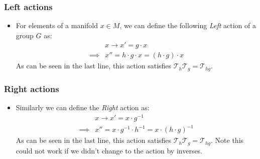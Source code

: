 \documentclass[11pt]{article}
\numberwithin{equation}{section}
\begin{document}
     \subsubsection{Left actions}
     \begin{itemize}
       \item For elements of a manifold $x \in M$, we can define the following \emph{Left} action of a group $G$ as: 
       \begin{align*}
       & x \rightarrow x' = g \cdot x \\ 
        \implies & x'' = h\cdot g \cdot x = (h \cdot g) \cdot x
       \end{align*}
       As can be seen in the last line, this action satisfies $\mathcal{T}_{h}\mathcal{T}_{g}=\mathcal{T}_{hg}$. 
     \end{itemize}
          \subsubsection{Right actions}
     \begin{itemize}
       \item Similarly we can define the  \emph{Right} action as: 
       \begin{align*}
       & x \rightarrow x' =  x \cdot g^{-1}\\ 
        \implies & x'' = x \cdot g^{-1} \cdot h^{-1} = x \cdot (h \cdot g)^{-1}
       \end{align*}
       As can be seen in the last line, this action satisfies $\mathcal{T}_{h}\mathcal{T}_{g}=\mathcal{T}_{hg}$. Note this could not work if we didn't change to the action by inverses.
     \end{itemize}
\end{document}
